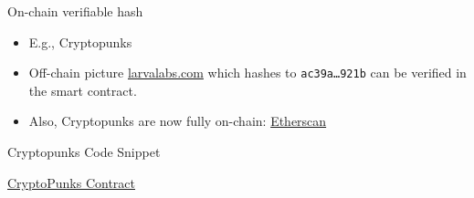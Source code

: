 \documentclass[handout]{beamer}
\begin{document}
\begin{frame}{On-chain verifiable hash}
	\begin{itemize}
		\item E.g., Cryptopunks
		\item Off-chain picture \link \href{https://www.larvalabs.com/public/images/cryptopunks/punks.png}{larvalabs.com} which hashes to \texttt{\scriptsize ac39a\dots 921b} can be verified in the smart contract.
		\item Also, Cryptopunks are now fully on-chain: \link \href{https://etherscan.io/address/0x16f5a35647d6f03d5d3da7b35409d65ba03af3b2}{Etherscan}  %
	\end{itemize}
	\begin{samplecode}{Cryptopunks Code Snippet}
		
	\end{samplecode}
\vspace{-1em}
\begin{center}
	\link \href{https://etherscan.io/address/0xb47e3cd837ddf8e4c57f05d70ab865de6e193bbb}{CryptoPunks Contract}
\end{center}
\end{frame}
\end{document}
